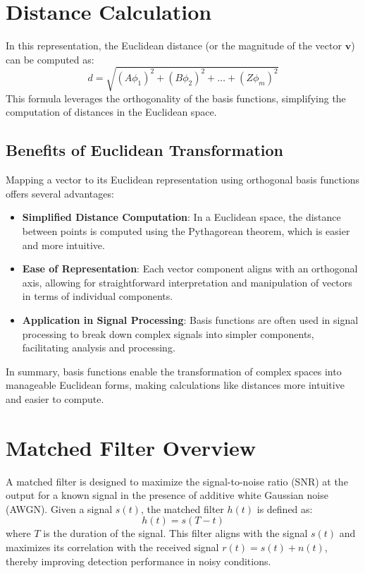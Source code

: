 \documentclass[10pt]{article}
\begin{document}
\section{Distance Calculation}
In this representation, the Euclidean distance (or the magnitude of the vector \( \mathbf{v} \)) can be computed as:
\[
d = \sqrt{(A \phi_1)^2 + (B \phi_2)^2 + \ldots + (Z \phi_m)^2}
\]
This formula leverages the orthogonality of the basis functions, simplifying the computation of distances in the Euclidean space.

\subsection{Benefits of Euclidean Transformation}
Mapping a vector to its Euclidean representation using orthogonal basis functions offers several advantages:
\begin{itemize}
    \item \textbf{Simplified Distance Computation}: In a Euclidean space, the distance between points is computed using the Pythagorean theorem, which is easier and more intuitive.
    \item \textbf{Ease of Representation}: Each vector component aligns with an orthogonal axis, allowing for straightforward interpretation and manipulation of vectors in terms of individual components.
    \item \textbf{Application in Signal Processing}: Basis functions are often used in signal processing to break down complex signals into simpler components, facilitating analysis and processing.
\end{itemize}

In summary, basis functions enable the transformation of complex spaces into manageable Euclidean forms, making calculations like distances more intuitive and easier to compute.


\section{Matched Filter Overview}
A matched filter is designed to maximize the signal-to-noise ratio (SNR) at the output for a known signal in the presence of additive white Gaussian noise (AWGN). Given a signal \( s(t) \), the matched filter \( h(t) \) is defined as:
\[
h(t) = s(T - t)
\]
where \( T \) is the duration of the signal. This filter aligns with the signal \( s(t) \) and maximizes its correlation with the received signal \( r(t) = s(t) + n(t) \), thereby improving detection performance in noisy conditions.
\end{document}
